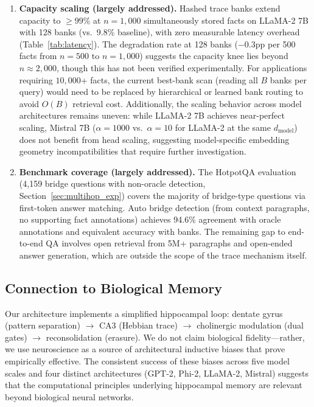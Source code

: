 \documentclass[11pt,a4paper]{article}
\begin{document}
\begin{enumerate}[leftmargin=*]
  \item \textbf{Capacity scaling (largely addressed).} Hashed trace banks extend capacity to ${\geq}99\%$ at $n{=}1{,}000$ simultaneously stored facts on LLaMA-2 7B with 128 banks (vs.\ 9.8\% baseline), with zero measurable latency overhead (Table~\ref{tab:latency}). The degradation rate at 128 banks ($-0.3$pp per 500 facts from $n{=}500$ to $n{=}1{,}000$) suggests the capacity knee lies beyond $n{\approx}2{,}000$, though this has not been verified experimentally. For applications requiring $10{,}000$+ facts, the current best-bank scan (reading all $B$ banks per query) would need to be replaced by hierarchical or learned bank routing to avoid $O(B)$ retrieval cost. Additionally, the scaling behavior across model architectures remains uneven: while LLaMA-2 7B achieves near-perfect scaling, Mistral 7B ($\alpha{=}1000$ vs.\ $\alpha{=}10$ for LLaMA-2 at the same $d_{\text{model}}$) does not benefit from head scaling, suggesting model-specific embedding geometry incompatibilities that require further investigation.

  \item \textbf{Benchmark coverage (largely addressed).} The HotpotQA evaluation (4,159 bridge questions with non-oracle detection, Section~\ref{sec:multihop_exp}) covers the majority of bridge-type questions via first-token answer matching. Auto bridge detection (from context paragraphs, no supporting fact annotations) achieves 94.6\% agreement with oracle annotations and equivalent accuracy with banks. The remaining gap to end-to-end QA involves open retrieval from 5M+ paragraphs and open-ended answer generation, which are outside the scope of the trace mechanism itself.
\end{enumerate}

\subsection{Connection to Biological Memory}

Our architecture implements a simplified hippocampal loop: dentate gyrus (pattern separation) $\to$ CA3 (Hebbian trace) $\to$ cholinergic modulation (dual gates) $\to$ reconsolidation (erasure). We do not claim biological fidelity---rather, we use neuroscience as a source of architectural inductive biases that prove empirically effective. The consistent success of these biases across five model scales and four distinct architectures (GPT-2, Phi-2, LLaMA-2, Mistral) suggests that the computational principles underlying hippocampal memory are relevant beyond biological neural networks.
\end{document}
